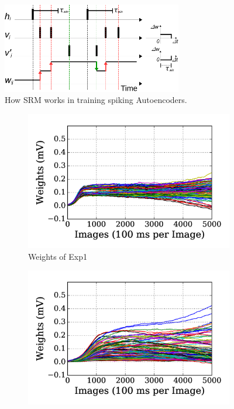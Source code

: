 \begin{figure}[th]
	\centering
	\includegraphics[width=0.7\textwidth]{pics_sdlm/rSTDP.pdf}
	\caption{How SRM works in training spiking Autoencoders.}
	\label{fig:rSTDP}
\end{figure}

\begin{figure}
	\centering
	\begin{subfigure}[t]{0.45\textwidth}
		\includegraphics[width=\textwidth]{pics_sdlm/00_exp_SAE_Orig/exp1_weights_s.png}
		\caption{Weights of Exp1}
	\end{subfigure}
	\begin{subfigure}[t]{0.45\textwidth}
		\includegraphics[width=\textwidth]{pics_sdlm/00_exp_SAE_Orig/exp2_weights_s.png}

\end{subfigure}
\end{figure}

